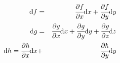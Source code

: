 \begin{eqnarray}
    \dd f &=& \DP f x \dd x + \DP f y \dd y
    \label{eq:exact_multi1}
    \\
    \dd g &=& \DP g x \dd x + \DP g y \dd y + \DP g z \dd z
    \label{eq:exact_multi2}
    \\
    \dd h = \DP h x \dd x &+& \DP h y \dd y
    \label{eq:exact_multi3}
\end{eqnarray}
